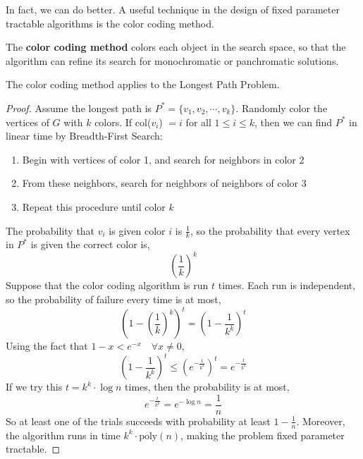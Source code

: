 In fact, we can do better. A useful technique in the design of fixed parameter tractable algorithms is the color coding method.

\begin{defn}
	The \textbf{color coding method} colors each object in the search space, so that the algorithm can refine its search for monochromatic or panchromatic solutions.
\end{defn}

\begin{rmk}
	The color coding method applies to the Longest Path Problem.
\end{rmk}

\begin{proof}
	Assume the longest path is $P^* = \{v_1, v_2, \cdots, v_k\}$. Randomly color the vertices of $G$ with $k$ colors. If col($v_i$) $= i$ for all $1 \leq i \leq k$, then we can find $P^*$ in linear time by Breadth-First Search:
	\begin{enumerate}
		\item Begin with vertices of color 1, and search for neighbors in color 2
		\item From these neighbors, search for neighbors of neighbors of color 3
		\item Repeat this procedure until color $k$
	\end{enumerate}
	\noindent The probability that $v_i$ is given color $i$ is $\frac{1}{k}$, so the probability that every vertex in $P^*$ is given the correct color is,
	\[\left(\frac{1}{k}\right)^k\]
	Suppose that the color coding algorithm is run $t$ times. Each run is independent, so the probability of failure every time is at most,
	\[\left(1-\left(\frac{1}{k}\right)^{k}\right)^{t}=\left(1-\frac{1}{k^{k}}\right)^{t}\]
	\noindent Using the fact that $1-x<e^{-x} \quad \forall x \neq 0$,
	\[\left(1-\frac{1}{k^{k}}\right)^{t} \leq\left(e^{-\frac{1}{k^{k}}}\right)^{t}=e^{-\frac{t}{k^{k}}}\]
	\noindent If we try this $t = k^k \cdot \log n$ times, then the probability is at most,
	\[e^{-\frac{t}{k^{k}}}=e^{-\log n}=\frac{1}{n}\]
	\noindent So at least one of the trials succeeds with probability at least $1 - \frac{1}{n}$. Moreover, the algorithm runs in time $k^k \cdot \text{poly}(n)$, making the problem fixed parameter tractable.
\end{proof}












